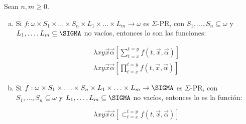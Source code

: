   \begin{lemma}
    \PN Sean $n, m \geq 0$.

    \begin{enumerate}[a)]
      \item Si $f: \omega \times S_{1} \times \dotsc \times S_{n} \times L_{1} \times \dotsc \times L_{m} \rightarrow
        \omega$ es $\Sigma$-PR, con $ S_{1}, \dotsc, S_{n} \subseteq \omega$ y $L_{1}, \dotsc, L_{m} \subseteq \SIGMA$
        no vacíos, entonces lo son las funciones:

        \begin{eqnarray}
          \nonumber \lambda xy\vec{x}\vec{\alpha} \left[\sum_{t=x}^{t=y} f(t,\vec{x},\vec{\alpha})\right] \\
          \nonumber \lambda xy\vec{x}\vec{\alpha} \left[\prod_{t=x}^{t=y}f(t,\vec{x},\vec{\alpha})\right]
        \end{eqnarray}

      \item Si $f: \omega \times S_{1} \times \dotsc \times S_{n} \times L_{1} \times \dotsc \times L_{m} \rightarrow
        \SIGMA$ es $\Sigma$-PR, con $ S_{1}, \dotsc, S_{n} \subseteq \omega$ y $L_{1}, \dotsc, L_{m} \subseteq \SIGMA$
        no vacíos, entonces lo es la función:

        \[
          \lambda xy\vec{x}\vec{\alpha}\left[\subset_{t=x}^{t=y} f(t,\vec{x},\vec{\alpha})\right]
        \]
    \end{enumerate}
  \end{lemma}
